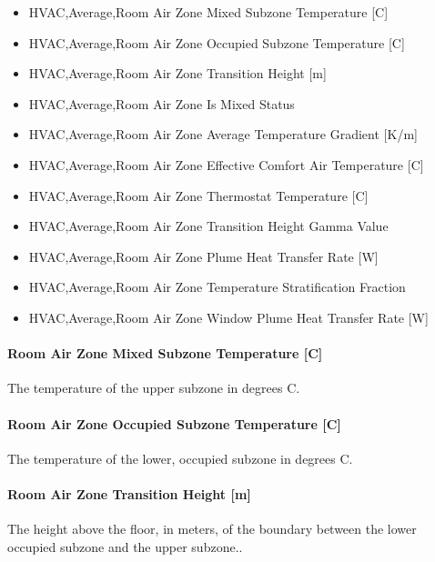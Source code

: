\begin{itemize}
\item
  HVAC,Average,Room Air Zone Mixed Subzone Temperature {[}C{]}
\item
  HVAC,Average,Room Air Zone Occupied Subzone Temperature {[}C{]}
\item
  HVAC,Average,Room Air Zone Transition Height {[}m{]}
\item
  HVAC,Average,Room Air Zone Is Mixed Status \protect\hyperlink{section-1}{}
\item
  HVAC,Average,Room Air Zone Average Temperature Gradient {[}K/m{]}
\item
  HVAC,Average,Room Air Zone Effective Comfort Air Temperature {[}C{]}
\item
  HVAC,Average,Room Air Zone Thermostat Temperature {[}C{]}
\item
  HVAC,Average,Room Air Zone Transition Height Gamma Value \protect\hyperlink{section-1}{}
\item
  HVAC,Average,Room Air Zone Plume Heat Transfer Rate {[}W{]}
\item
  HVAC,Average,Room Air Zone Temperature Stratification Fraction \protect\hyperlink{section-1}{}
\item
  HVAC,Average,Room Air Zone Window Plume Heat Transfer Rate {[}W{]}
\end{itemize}

\paragraph{Room Air Zone Mixed Subzone Temperature {[}C{]}}\label{room-air-zone-mixed-subzone-temperature-c-1}

The temperature of the upper subzone in degrees C.

\paragraph{Room Air Zone Occupied Subzone Temperature {[}C{]}}\label{room-air-zone-occupied-subzone-temperature-c-1}

The temperature of the lower, occupied subzone in degrees C.

\paragraph{Room Air Zone Transition Height {[}m{]}}\label{room-air-zone-transition-height-m-1}

The height above the floor, in meters, of the boundary between the lower occupied subzone and the upper subzone..

